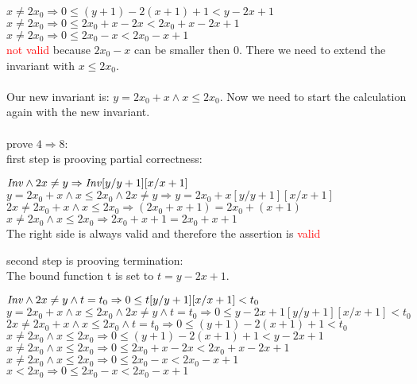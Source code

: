 \documentclass[a4paper]{scrartcl}
\begin{document}
$x \neq 2x_0 \Rightarrow 0 \leq (y + 1) - 2(x + 1) + 1 < y - 2x + 1$\\
$x \neq 2x_0 \Rightarrow 0 \leq 2x_0 + x - 2x < 2x_0 + x - 2x + 1$\\
$x \neq 2x_0 \Rightarrow 0 \leq 2x_0 - x < 2x_0 - x + 1$\\
\textcolor{red}{not valid} because $2x_0 - x$ can be smaller then 0. There we need to extend the
invariant with $x \leq 2x_0$.\\
\\
Our new invariant is: $y = 2x_0 + x \land x \leq 2x_0$. Now we need to start the calculation again with the new invariant.\\
\\
prove $4 \Rightarrow 8$:\\
first step is prooving partial correctness:\\
\begin{center}
$\mathit{Inv} \land 2x \neq y \Rightarrow \mathit{Inv} [y/y+1][x/x+1]$\\
$y = 2x_0 + x \land x \leq 2x_0 \land 2x \neq y \Rightarrow y = 2x_0 + x [y/y+1][x/x+1]$\\
$2x \neq 2x_0 + x \land x \leq 2x_0 \Rightarrow (2x_0 + x + 1) = 2x_0 + (x+1)$\\
$x \neq 2x_0 \land x \leq 2x_0 \Rightarrow 2x_0 + x + 1 = 2x_0 + x+1$\\
The right side is always valid and therefore the assertion is \textcolor{red}{valid}
\end{center} 
second step is prooving termination:\\
The bound function t is set to $t = y - 2x + 1$.\\
\begin{center}
$\mathit{Inv} \land 2x \neq y \land t = t_0 \Rightarrow 0 \leq t[y/y+1][x/x+1] < t_0$\\
$y = 2x_0 + x \land x \leq 2x_0 \land 2x \neq y \land t = t_0 \Rightarrow 0 \leq y - 2x + 1[y/y+1][x/x+1] < t_0$\\
$2x \neq 2x_0 + x \land x \leq 2x_0 \land t = t_0 \Rightarrow 0 \leq (y + 1) - 2(x + 1) + 1 < t_0$\\
$x \neq 2x_0 \land x \leq 2x_0 \Rightarrow 0 \leq (y + 1) - 2(x + 1) + 1 < y - 2x + 1$\\
$x \neq 2x_0 \land x \leq 2x_0 \Rightarrow 0 \leq 2x_0 + x - 2x < 2x_0 + x - 2x + 1$\\
$x \neq 2x_0 \land x \leq 2x_0 \Rightarrow 0 \leq 2x_0 - x < 2x_0 - x + 1$\\
$x < 2x_0 \Rightarrow 0 \leq 2x_0 - x < 2x_0 - x + 1$\\
\end{center} 
\end{document}
